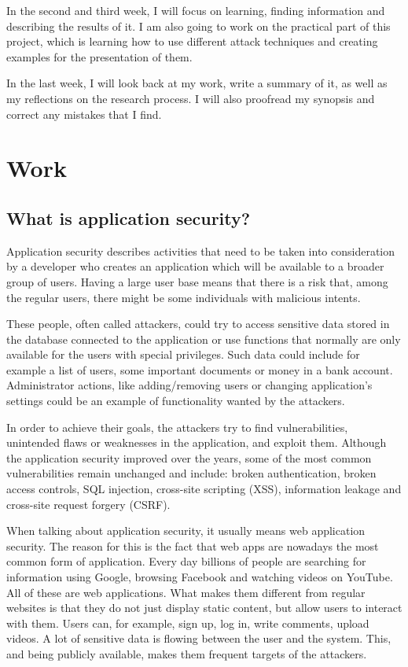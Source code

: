 \documentclass[a4paper]{article}
\begin{document}
In the second and third week, I will focus on learning, finding information and
describing the results of it. I am also going to work on the practical part of
this project, which is learning how to use different attack techniques and
creating examples for the presentation of them.

In the last week, I will look back at my work, write a summary of it, as well as
my reflections on the research process. I will also proofread my synopsis and
correct any mistakes that I find.

\newpage

\section{Work}

\subsection{What is application security?}

Application security describes activities that need to be taken into
consideration by a developer who creates an application which will be available
to a broader group of users. Having a large user base means that there is a risk
that, among the regular users, there might be some individuals with malicious
intents.

These people, often called attackers, could try to access sensitive data
stored in the database connected to the application or use functions that
normally are only available for the users with special privileges. Such data
could include for example a list of users, some important documents or money in
a bank account. Administrator actions, like adding/removing users or changing
application's settings could be an example of functionality wanted by the
attackers.\autocite{whatisappsec}

In order to achieve their goals, the attackers try to find vulnerabilities,
unintended flaws or weaknesses in the application, and exploit them. Although
the application security improved over the years, some of the most common
vulnerabilities remain unchanged and include: broken authentication, broken
access controls, SQL injection, cross-site scripting (XSS), information leakage
and cross-site request forgery (CSRF).

When talking about application security, it usually means web application
security. The reason for this is the fact that web apps are nowadays the most
common form of application. Every day billions of people are searching for
information using Google, browsing Facebook and watching videos on YouTube. All
of these are web applications. What makes them different from regular websites
is that they do not just display static content, but allow users to interact
with them. Users can, for example, sign up, log in, write comments, upload
videos. A lot of sensitive data is flowing between the user and the system.
This, and being publicly available, makes them frequent targets of the
attackers.\autocite{wahh}
\end{document}
